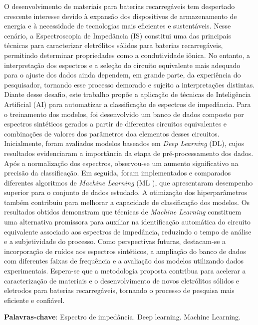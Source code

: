 \setlength{\absparsep}{18pt} %
\begin{resumo}
 O desenvolvimento de materiais para baterias recarregáveis tem despertado crescente interesse devido à expansão dos dispositivos de armazenamento de energia e à necessidade de tecnologias mais eficientes e sustentáveis. Nesse cenário, a Espectroscopia de Impedância (IS) constitui uma das principais técnicas para caracterizar eletrólitos sólidos para baterias recarregáveis, permitindo determinar propriedades como a condutividade iônica. No entanto, a interpretação dos espectros e a seleção do circuito equivalente mais adequado para o ajuste dos dados ainda dependem, em grande parte, da experiência do pesquisador, tornando esse processo demorado e sujeito a interpretações distintas. Diante desse desafio, este trabalho propõe a aplicação de técnicas de Inteligência Artificial (AI) para automatizar a classificação de espectros de impedância.
 Para o treinamento dos modelos, foi desenvolvido um banco de dados composto por espectros sintéticos gerados a partir de diferentes circuitos equivalentes e combinações de valores dos parâmetros doa elementos desses circuitos. Inicialmente, foram avaliados modelos baseados em \textit{Deep Learning} (DL), cujos resultados evidenciaram a importância da etapa de pré-processamento dos dados. Após a normalização dos espectros, observou-se um aumento significativo na precisão da classificação. Em seguida, foram implementados e comparados diferentes algoritmos de \textit{Machine Learning} (ML	), que apresentaram desempenho superior para o conjunto de dados estudado. A otimização dos hiperparâmetros também contribuiu para melhorar a capacidade de classificação dos modelos.
 Os resultados obtidos demonstram que técnicas de \textit{Machine Learning} constituem uma alternativa promissora para auxiliar na identificação automática do circuito equivalente associado aos espectros de impedância, reduzindo o tempo de análise e a subjetividade do processo. Como perspectivas futuras, destacam-se a incorporação de ruídos aos espectros sintéticos, a ampliação do banco de dados com diferentes faixas de frequência e a avaliação dos modelos utilizando dados experimentais. Espera-se que a metodologia proposta contribua para acelerar a caracterização de materiais e o desenvolvimento de novos eletrólitos sólidos e eletrodos para baterias recarregáveis, tornando o processo de pesquisa mais eficiente e confiável.

 \textbf{Palavras-chave}: Espectro de impedância. Deep learning. Machine Learning. 
\end{resumo}

